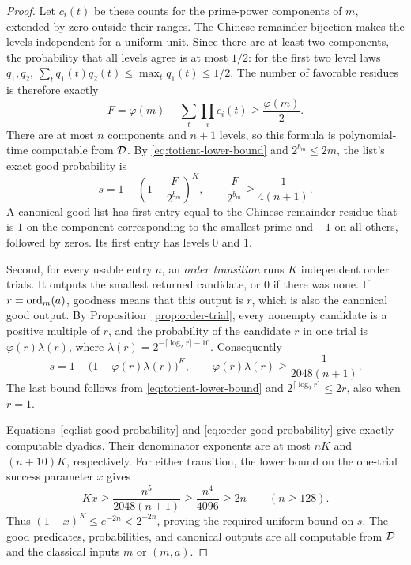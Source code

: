 \begin{proof}
Let $c_i(t)$ be these counts for the prime-power components of $m$,
extended by zero outside their ranges.  The Chinese remainder bijection
makes the levels independent for a uniform unit.  Since there are at
least two components, the probability that all levels agree is at most
$1/2$: for the first two level laws $q_1,q_2$,
$\sum_t q_1(t)q_2(t)\le\max_t q_1(t)\le1/2$.
The number of favorable residues is therefore exactly
\[
 F=\varphi(m)-\sum_t\prod_i c_i(t)\ge\frac{\varphi(m)}2.
\]
There are at most $n$ components and $n+1$ levels, so this formula is
polynomial-time computable from $\mathcal D$.  By
\eqref{eq:totient-lower-bound} and $2^{b_m}\le2m$, the list's exact good
probability is
\begin{equation}\label{eq:list-good-probability}
 s=1-\left(1-\frac{F}{2^{b_m}}\right)^K,
 \qquad \frac{F}{2^{b_m}}\ge\frac1{4(n+1)}.
\end{equation}
A canonical good list has first entry equal to the Chinese remainder
residue that is $1$ on the component corresponding to the smallest prime
and $-1$ on all others, followed by zeros.  Its first entry has levels $0$ and $1$.

Second, for every usable entry $a$, an \emph{order transition} runs $K$
independent order trials.  It outputs the smallest returned candidate,
or $0$ if there was none.  If $r=\operatorname{ord}_m(a)$, goodness means that this
output is $r$, which is also the canonical good output.  By
Proposition~\ref{prop:order-trial}, every nonempty candidate is a positive
multiple of $r$, and the probability of the candidate $r$ in one trial is
$\varphi(r)\lambda(r)$, where
$\lambda(r)=2^{-\lceil\log_2r\rceil-10}$.  Consequently
\begin{equation}\label{eq:order-good-probability}
 s=1-\bigl(1-\varphi(r)\lambda(r)\bigr)^K,
 \qquad \varphi(r)\lambda(r)\ge\frac1{2048(n+1)}.
\end{equation}
The last bound follows from \eqref{eq:totient-lower-bound} and
$2^{\lceil\log_2r\rceil}\le2r$, also when $r=1$.

Equations~\eqref{eq:list-good-probability} and
\eqref{eq:order-good-probability} give exactly computable dyadics.
Their denominator exponents are at most $nK$ and $(n+10)K$, respectively.
For either transition, the lower bound on the one-trial success parameter
$x$ gives
\[
 Kx\ge\frac{n^5}{2048(n+1)}
       \ge\frac{n^4}{4096}\ge2n
       \qquad(n\ge128).
\]
Thus $(1-x)^K\le e^{-2n}<2^{-2n}$, proving the required uniform bound on
$s$.  The good predicates, probabilities, and canonical outputs are all
computable from $\mathcal D$ and the classical inputs $m$ or $(m,a)$.


\end{proof}
